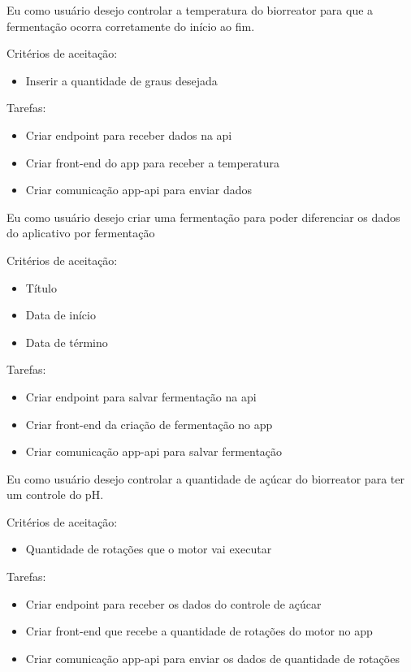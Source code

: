 
Eu como usuário desejo controlar a temperatura do biorreator para que a fermentação ocorra corretamente do início ao fim.

Critérios de aceitação:
\begin{itemize}
  \item Inserir a quantidade de graus desejada
\end{itemize}

Tarefas:
\begin{itemize}
  \item Criar endpoint para receber dados na api
  \item Criar front-end do app para receber a temperatura
  \item Criar comunicação app-api para enviar dados
\end{itemize}


Eu como usuário desejo criar uma fermentação para poder diferenciar os dados do aplicativo por fermentação

Critérios de aceitação:
\begin{itemize}
  \item Título
  \item Data de início
  \item Data de término
\end{itemize}

Tarefas:
\begin{itemize}
  \item Criar endpoint para salvar fermentação na api
  \item Criar front-end da criação de fermentação no app
  \item Criar comunicação app-api para salvar fermentação
\end{itemize}


Eu como usuário desejo controlar a quantidade de açúcar do biorreator para ter um controle do pH.

Critérios de aceitação:
\begin{itemize}
  \item Quantidade de rotações que o motor vai executar
\end{itemize}

Tarefas:
\begin{itemize}
  \item Criar endpoint para receber os dados do controle de açúcar
  \item Criar front-end que recebe a quantidade de rotações do motor no app
  \item Criar comunicação app-api para enviar os dados de quantidade de rotações
\end{itemize}

